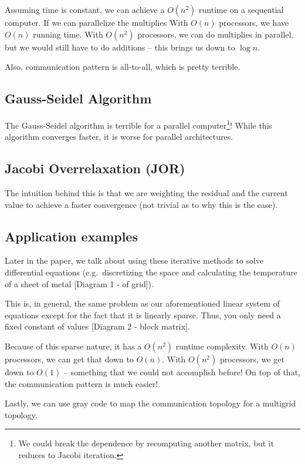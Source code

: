 Assuming time is constant, we can achieve a \( O (n^2) \) runtime on a sequential computer. If we can parallelize the multiplies With \( O(n) \) processors, we have \( O(n) \) running time. With \( O(n^2) \) processors, we can do multiplies in parallel, but we would still have to do additions -- this brings us down to \( \log{n} \).

Also, communication pattern is all-to-all, which is pretty terrible.

\subsection{Gauss-Seidel Algorithm}

The Gauss-Seidel algorithm is terrible for a parallel computer\footnote{We could break the dependence by recomputing another matrix, but it reduces to Jacobi iteration.}! While this algorithm converges faster, it is worse for parallel architectures.

\subsection{Jacobi Overrelaxation (JOR)}
The intuition behind this is that we are weighting the residual and the current value to achieve a faster convergence (not trivial as to why this is the case).

\subsection{Application examples}

Later in the paper, we talk about using these iterative methods to solve differential equations (e.g.\ discretizing the space and calculating the temperature of a sheet of metal [Diagram 1 - of grid]).

This is, in general, the same problem as our aforementioned linear system of equations except for the fact that it is linearly sparse. Thus, you only need a fixed constant of values [Diagram 2 - block matrix].

Because of this sparse nature, it has a \( O(n^2) \) runtime complexity. With \( O(n) \) processors, we can get that down to \( O(n) \). With \( O(n^2) \) processors, we get down to \( O(1) \) -- something that we could not accomplish before! On top of that, the communication pattern is much easier!

Lastly, we can use gray code to map the communication topology for a multigrid topology.

